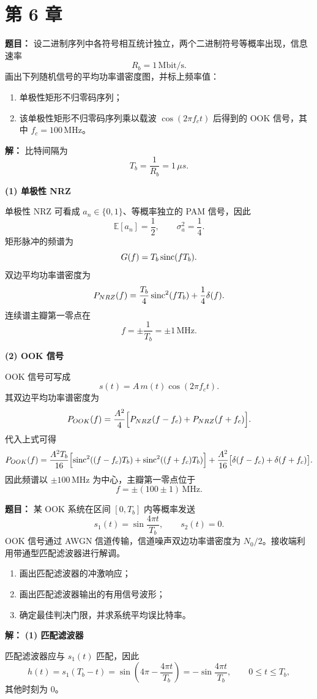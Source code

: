 \section*{第 6 章}

\textbf{题目：}
设二进制序列中各符号相互统计独立，两个二进制符号等概率出现，信息速率
\[
R_b=1\,\mathrm{Mbit/s}.
\]
画出下列随机信号的平均功率谱密度图，并标上频率值：
\begin{enumerate}
\item 单极性矩形不归零码序列；
\item 该单极性矩形不归零码序列乘以载波 $\cos(2\pi f_ct)$ 后得到的 OOK 信号，其中 $f_c=100\,\mathrm{MHz}$。
\end{enumerate}

\par\textbf{解：}
比特间隔为
\[
T_b=\frac{1}{R_b}=1\,\mu s.
\]

\textbf{(1) 单极性 NRZ}\par
单极性 NRZ 可看成 $a_n\in\{0,1\}$、等概率独立的 PAM 信号，因此
\[
\mathbb{E}[a_n]=\frac12,\qquad \sigma_a^2=\frac14.
\]
矩形脉冲的频谱为
\[
G(f)=T_b\operatorname{sinc}(fT_b).
\]
双边平均功率谱密度为
\[
P_{NRZ}(f)=\frac{T_b}{4}\operatorname{sinc}^2(fT_b)+\frac14\delta(f).
\]
连续谱主瓣第一零点在
\[
f=\pm \frac{1}{T_b}=\pm 1\,\mathrm{MHz}.
\]

\textbf{(2) OOK 信号}\par
OOK 信号可写成
\[
s(t)=A\,m(t)\cos(2\pi f_ct).
\]
其双边平均功率谱密度为
\[
P_{OOK}(f)=\frac{A^2}{4}\Bigl[P_{NRZ}(f-f_c)+P_{NRZ}(f+f_c)\Bigr].
\]
代入上式可得
\[
P_{OOK}(f)=\frac{A^2T_b}{16}\Bigl[\operatorname{sinc}^2((f-f_c)T_b)+\operatorname{sinc}^2((f+f_c)T_b)\Bigr]
+\frac{A^2}{16}\bigl[\delta(f-f_c)+\delta(f+f_c)\bigr].
\]
因此频谱以 $\pm100\,\mathrm{MHz}$ 为中心，主瓣第一零点位于
\[
f=\pm(100\pm 1)\,\mathrm{MHz}.
\]

\medskip
{}
\textbf{题目：}
某 OOK 系统在区间 $[0,T_b]$ 内等概率发送
\[
s_1(t)=\sin\frac{4\pi t}{T_b},
\qquad
s_2(t)=0.
\]
OOK 信号通过 AWGN 信道传输，信道噪声双边功率谱密度为 $N_0/2$。接收端利用带通型匹配滤波器进行解调。

\begin{enumerate}
\item 画出匹配滤波器的冲激响应；
\item 画出匹配滤波器输出的有用信号波形；
\item 确定最佳判决门限，并求系统平均误比特率。
\end{enumerate}

\par\textbf{解：}
\textbf{(1) 匹配滤波器}\par
匹配滤波器应与 $s_1(t)$ 匹配，因此
\[
h(t)=s_1(T_b-t)
=\sin\!\left(4\pi-\frac{4\pi t}{T_b}\right)
=-\sin\frac{4\pi t}{T_b},
\qquad 0\le t\le T_b,
\]
其他时刻为 $0$。

